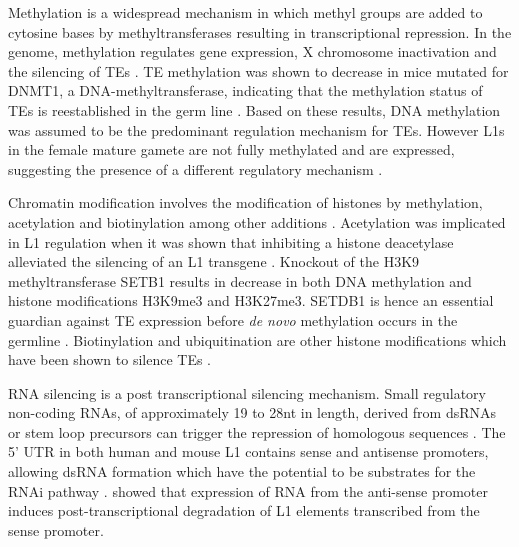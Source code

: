 \documentclass[12pt]{article}
\begin{document}
			
			Methylation is a widespread mechanism in which methyl groups are added to cytosine bases by methyltransferases resulting in transcriptional repression.
			In the genome, methylation regulates gene expression, X chromosome inactivation and the silencing of TEs \citep{EnLi14}.
			TE methylation was shown to decrease in mice mutated for DNMT1, a DNA-methyltransferase, indicating that the methylation status of TEs is reestablished in the germ line \citep{Walsh98, Okano99, Bourchis04, Liu14}.
			Based on these results, DNA methylation was assumed to be the predominant regulation mechanism for TEs.
			However L1s in the female mature gamete are not fully methylated and are expressed, suggesting the presence of a different regulatory mechanism \citep{Peaston04}.	
			
			Chromatin modification involves the modification of histones by methylation, acetylation and biotinylation among other additions \citep{Eichten14}.
			Acetylation was implicated in L1 regulation when it was shown that inhibiting a histone deacetylase alleviated the silencing of an L1 transgene \citep{Garcia-Perez10}.
			Knockout of the H3K9 methyltransferase SETB1 results in decrease in both DNA methylation and histone modifications H3K9me3 and H3K27me3. 
			SETDB1 is hence an essential guardian against TE expression before \textit{de novo} methylation occurs in the germline \citep{Liu14}.
			Biotinylation and ubiquitination are other histone modifications which have been shown to silence TEs \citep{Sridhar07,Chew08,Zempleni09}. 

			RNA silencing is a post transcriptional silencing mechanism.
			Small regulatory non-coding RNAs, of approximately 19 to 28nt in length, derived from dsRNAs or stem loop precursors can trigger the repression of homologous sequences \citep{Obbard09}.
			The 5' UTR in both human and mouse L1 contains sense and antisense promoters, allowing dsRNA formation which have the potential to be substrates for the RNAi pathway \citep{Matlik06,JingfengLi14}.
			\citet{Yang06} showed that expression of RNA from the anti-sense promoter induces post-transcriptional degradation of L1 elements transcribed from the sense promoter.
			
\end{document}
